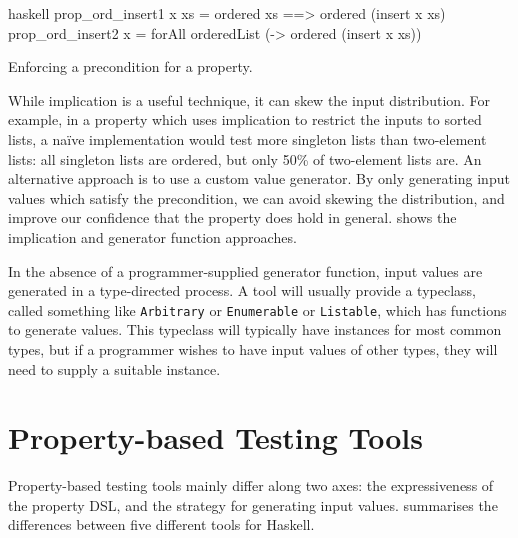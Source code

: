 \begin{listing}
\centering
\begin{cminted}{haskell}
prop_ord_insert1 x xs = ordered xs ==> ordered (insert x xs)
prop_ord_insert2 x    = forAll orderedList (\xs -> ordered (insert x xs))
\end{cminted}
\caption{Enforcing a precondition for a property.}\label{lst:prop_ord_insert}
\end{listing}

While implication is a useful technique, it can skew the input
distribution.  For example, in a property which uses implication to
restrict the inputs to sorted lists, a na\"ive implementation would
test more singleton lists than two-element lists: all singleton lists
are ordered, but only 50\% of two-element lists are.  An alternative
approach is to use a custom value generator.  By only generating input
values which satisfy the precondition, we can avoid skewing the
distribution, and improve our confidence that the property does hold
in general.   shows the implication and
generator function approaches.

In the absence of a programmer-supplied generator function, input
values are generated in a type-directed process.  A tool will usually
provide a typeclass, called something like \verb|Arbitrary| or
\verb|Enumerable| or \verb|Listable|, which has functions to generate
values.  This typeclass will typically have instances for most common
types, but if a programmer wishes to have input values of other types,
they will need to supply a suitable instance.

\section{Property-based Testing Tools}
\label{sec:property_testing-tools}

Property-based testing tools mainly differ along two axes: the
expressiveness of the property DSL, and the strategy for generating
input values.   summarises the differences between
five different tools for Haskell.

\begingroup
\newcommand{\YY}{\CIRCLE}
\newcommand{\NN}{\Circle}
\newcommand{\YN}{\LEFTcircle}
\newcommand{\QQ}{\NN$^p$}

